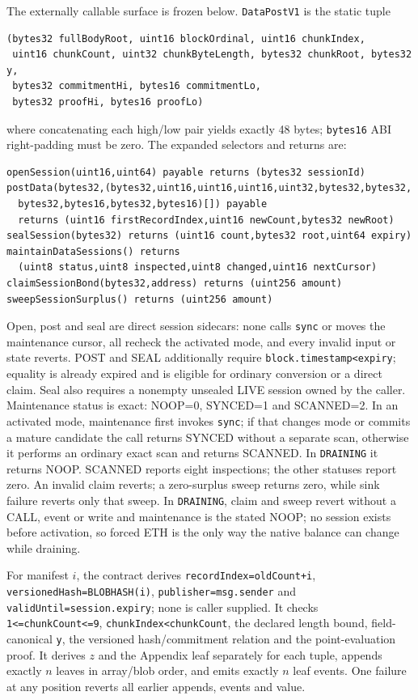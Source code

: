 \documentclass[a4paper,11pt]{article}
\newcommand{\code}[1]{\nolinkurl{#1}}
\begin{document}
The externally callable surface is frozen below.  \code{DataPostV1} is the
static tuple
\begin{verbatim}
(bytes32 fullBodyRoot, uint16 blockOrdinal, uint16 chunkIndex,
 uint16 chunkCount, uint32 chunkByteLength, bytes32 chunkRoot, bytes32 y,
 bytes32 commitmentHi, bytes16 commitmentLo,
 bytes32 proofHi, bytes16 proofLo)
\end{verbatim}
where concatenating each high/low pair yields exactly 48 bytes; \code{bytes16}
ABI right-padding must be zero.  The expanded selectors and returns are:
\begin{verbatim}
openSession(uint16,uint64) payable returns (bytes32 sessionId)
postData(bytes32,(bytes32,uint16,uint16,uint16,uint32,bytes32,bytes32,
  bytes32,bytes16,bytes32,bytes16)[]) payable
  returns (uint16 firstRecordIndex,uint16 newCount,bytes32 newRoot)
sealSession(bytes32) returns (uint16 count,bytes32 root,uint64 expiry)
maintainDataSessions() returns
  (uint8 status,uint8 inspected,uint8 changed,uint16 nextCursor)
claimSessionBond(bytes32,address) returns (uint256 amount)
sweepSessionSurplus() returns (uint256 amount)
\end{verbatim}
Open, post and seal are direct session sidecars: none calls \code{sync} or moves
the maintenance cursor, all recheck the activated mode, and every
invalid input or state reverts.  POST and SEAL additionally require
\code{block.timestamp<expiry}; equality is already expired and is eligible for
ordinary conversion or a direct claim.  Seal also requires a nonempty unsealed
LIVE session owned by the caller.  Maintenance status is exact: NOOP=0,
SYNCED=1 and SCANNED=2.  In an activated mode, maintenance first invokes
\code{sync}; if that changes mode or commits a mature candidate the call
returns SYNCED without a separate scan, otherwise it performs an ordinary exact
scan and returns SCANNED.  In \code{DRAINING} it returns NOOP.  SCANNED reports
eight inspections; the other statuses report zero.  An invalid claim reverts;
a zero-surplus sweep returns zero, while sink failure reverts only that sweep.
In \code{DRAINING}, claim and sweep revert without a CALL, event or write and
maintenance is the stated NOOP; no session exists before activation, so forced
ETH is the only way the native balance can change while draining.

For manifest $i$, the contract derives \code{recordIndex=oldCount+i},
\code{versionedHash=BLOBHASH(i)}, \code{publisher=msg.sender} and
\code{validUntil=session.expiry}; none is caller supplied.  It checks
\code{1<=chunkCount<=9}, \code{chunkIndex<chunkCount}, the declared length
bound, field-canonical \code{y}, the versioned hash/commitment relation and the
point-evaluation proof.  It derives $z$ and the Appendix leaf separately for
each tuple, appends exactly $n$ leaves in array/blob order, and emits exactly
$n$ leaf events.  One failure at any position reverts all earlier appends,
events and value.
\end{document}
